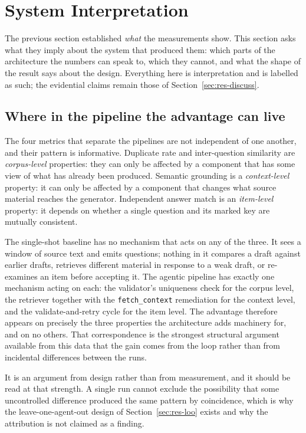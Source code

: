 \section{System Interpretation}
\label{sec:res-interpretation}

The previous section established \emph{what} the measurements show. This section
asks what they imply about the system that produced them: which parts of the
architecture the numbers can speak to, which they cannot, and what the shape of
the result says about the design. Everything here is interpretation and is
labelled as such; the evidential claims remain those of
Section~\ref{sec:res-discuss}.

\subsection{Where in the pipeline the advantage can live}

The four metrics that separate the pipelines are not independent of one another,
and their pattern is informative. Duplicate rate and inter-question similarity
are \emph{corpus-level} properties: they can only be affected by a component that
has some view of what has already been produced. Semantic grounding is a
\emph{context-level} property: it can only be affected by a component that
changes what source material reaches the generator. Independent answer match is
an \emph{item-level} property: it depends on whether a single question and its
marked key are mutually consistent.

The single-shot baseline has no mechanism that acts on any of the three. It sees
a window of source text and emits questions; nothing in it compares a draft
against earlier drafts, retrieves different material in response to a weak draft,
or re-examines an item before accepting it. The agentic pipeline has exactly one
mechanism acting on each: the validator's uniqueness check for the corpus level,
the retriever together with the \texttt{fetch\_context} remediation for the
context level, and the validate-and-retry cycle for the item level. The
advantage therefore appears on precisely the three properties the architecture
adds machinery for, and on no others. That correspondence is the strongest
structural argument available from this data that the gain comes from the loop
rather than from incidental differences between the runs.

It is an argument from design rather than from measurement, and it should be
read at that strength. A single run cannot exclude the possibility that some
uncontrolled difference produced the same pattern by coincidence, which is why
the leave-one-agent-out design of Section~\ref{sec:res-loo} exists and why the
attribution is not claimed as a finding.

